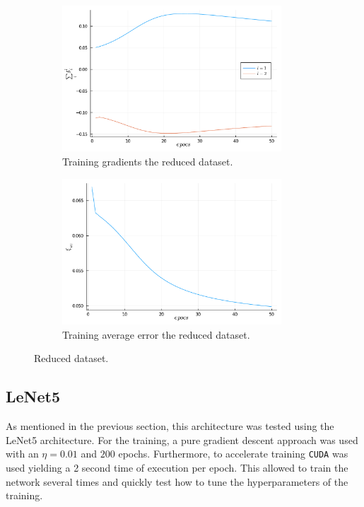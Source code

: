 \documentclass[conference]{IEEEtran}
\theoremstyle{definition}
\theoremstyle{remark}
\theoremstyle{remark}
\begin{document}
\begin{figure}
  \centering
  \begin{subfigure}[b]{0.45\textwidth}
    \centering
    \includegraphics[width=0.9\textwidth]{figs/grads-learn-data-reduced.pdf}
    \caption{Training gradients the reduced dataset.}
  \end{subfigure}
  \begin{subfigure}[b]{0.45\textwidth}
    \centering
    \includegraphics[width=0.9\textwidth]{figs/avg-err-learn-data-reduced.pdf}
    \caption{Training average error the reduced dataset.}
  \end{subfigure}
  \caption{Reduced dataset.}
  \label{fig:reduced-dims}
\end{figure}

\subsection{LeNet5}

As mentioned in the previous section, this architecture was tested using the
LeNet5 architecture. For the training, a pure gradient descent approach was used
with an $\eta = 0.01$ and $200$ epochs. Furthermore, to accelerate training
\texttt{CUDA} was used yielding a 2 second time of execution per epoch. This
allowed to train the network several times and quickly test how to tune the
hyperparameters of the training.
\end{document}
